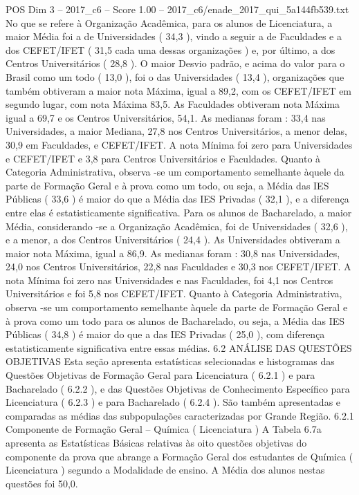 \begin{textsample}{POS Dim 3 – 2017\_c6 – Score 1.00 – 2017\_c6/enade\_2017\_qui\_5a144fb539.txt}
No que se refere à Organização Acadêmica, para os alunos de Licenciatura, a maior Média foi a de Universidades ( 34,3 ), vindo a seguir a de Faculdades e a dos CEFET/IFET ( 31,5 cada uma dessas organizações ) e, por último, a dos Centros Universitários ( 28,8 ).
O maior Desvio padrão, e acima do valor para o Brasil como um todo ( 13,0 ), foi o das Universidades ( 13,4 ), organizações que também obtiveram a maior nota Máxima, igual a 89,2, com os CEFET/IFET em segundo lugar, com nota Máxima 83,5.
As Faculdades obtiveram nota Máxima igual a 69,7 e os Centros Universitários, 54,1.
As medianas foram : 33,4 nas Universidades, a maior Mediana, 27,8 nos Centros Universitários, a menor delas, 30,9 em Faculdades, e CEFET/IFET.
A nota Mínima foi zero para Universidades e CEFET/IFET e 3,8 para Centros Universitários e Faculdades.
Quanto à Categoria Administrativa, observa -se um comportamento semelhante àquele da parte de Formação Geral e à prova como um todo, ou seja, a Média das IES Públicas ( 33,6 ) é maior do que a Média das IES Privadas ( 32,1 ), e a diferença entre elas é estatisticamente significativa.
Para os alunos de Bacharelado, a maior Média, considerando -se a Organização Acadêmica, foi de Universidades ( 32,6 ), e a menor, a dos Centros Universitários ( 24,4 ).
As Universidades obtiveram a maior nota Máxima, igual a 86,9.
As medianas foram : 30,8 nas Universidades, 24,0 nos Centros Universitários, 22,8 nas Faculdades e 30,3 nos CEFET/IFET.
A nota Mínima foi zero nas Universidades e nas Faculdades, foi 4,1 nos Centros Universitários e foi 5,8 nos CEFET/IFET.
Quanto à Categoria Administrativa, observa -se um comportamento semelhante àquele da parte de Formação Geral e à prova como um todo para os alunos de Bacharelado, ou seja, a Média das IES Públicas ( 34,8 ) é maior do que a das IES Privadas ( 25,0 ), com diferença estatisticamente significativa entre essas médias. 6.2 ANÁLISE DAS QUESTÕES OBJETIVAS Esta seção apresenta estatísticas selecionadas e histogramas das Questões Objetivas de Formação Geral para Licenciatura ( 6.2.1 ) e para Bacharelado ( 6.2.2 ), e das Questões Objetivas de Conhecimento Específico para Licenciatura ( 6.2.3 ) e para Bacharelado ( 6.2.4 ).
São também apresentadas e comparadas as médias das subpopulações caracterizadas por Grande Região. 6.2.1 Componente de Formação Geral – Química ( Licenciatura ) A Tabela 6.7a apresenta as Estatísticas Básicas relativas às oito questões objetivas do componente da prova que abrange a Formação Geral dos estudantes de Química ( Licenciatura ) segundo a Modalidade de ensino.
A Média dos alunos nestas questões foi 50,0.

\end{textsample}
